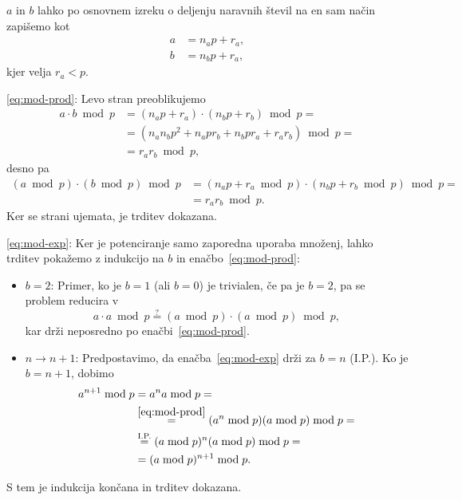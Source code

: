 \documentclass[isrm2, tisk]{fmfdelo}
\begin{document}
\begin{dokaz}
    $a$ in $b$ lahko po osnovnem izreku o deljenju naravnih števil na en sam način zapišemo kot 
    \begin{align*}
        a &= n_a p + r_a, \\
        b &= n_b p + r_a,
    \end{align*}
    kjer velja $r_a < p$.
    
    \eqref{eq:mod-prod}: Levo stran preoblikujemo
    \begin{align*}
        a \cdot b \bmod p &= (n_a p + r_a) \cdot (n_b p + r_b) \bmod p = \\
                          &= (n_a n_b p^2 + n_a p r_b + n_b p r_a + r_a r_b) \bmod p = \\
                          &= r_a r_b \bmod p,
    \end{align*}
    desno pa
    \begin{align*}
        (a \bmod p) \cdot (b \bmod p) \bmod p &= (n_a p + r_a \bmod p) \cdot (n_b p + r_b \bmod p) \bmod p = \\
                          &= r_a r_b \bmod p.
    \end{align*}
    Ker se strani ujemata, je trditev dokazana.

    \eqref{eq:mod-exp}: Ker je potenciranje samo zaporedna uporaba množenj, lahko trditev pokažemo z 
    indukcijo na $b$ in enačbo~\eqref{eq:mod-prod}:
    \begin{itemize}
        \item $b = 2$: Primer, ko je $b = 1$ (ali $b = 0$) je trivialen, če pa je $b = 2$, pa se 
            problem reducira v 
            $$ 
            a \cdot a \bmod p \stackrel{?}{=} (a \bmod p) \cdot (a \bmod p) \bmod p,
            $$
            kar drži neposredno po enačbi~\eqref{eq:mod-prod}.
        \item $n \rightarrow n + 1$: Predpostavimo, da enačba~\eqref{eq:mod-exp} drži za $b = n$ (I.P.). 
            Ko je $b = n + 1$, dobimo 
            \begin{align*}
                a^{n + 1} \bmod p &= a^n a \bmod p = \\ 
                                  &\stackrel{\eqref{eq:mod-prod}}{=} (a^n \bmod p) (a \bmod p) \bmod p = \\
                                  &\stackrel{\text{I.P.}}{=} (a \bmod p)^n (a \bmod p) \bmod p = \\
                                  &= (a \bmod p)^{n + 1} \bmod p.
            \end{align*}
    \end{itemize}
    S tem je indukcija končana in trditev dokazana.
\end{dokaz}
\end{document}
